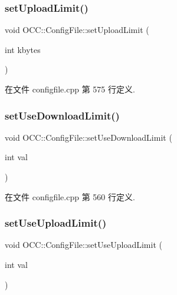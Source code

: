 \subsubsection{\texorpdfstring{set\+Upload\+Limit()}{setUploadLimit()}}
{\footnotesize\ttfamily void O\+C\+C\+::\+Config\+File\+::set\+Upload\+Limit (\begin{DoxyParamCaption}\item[{int}]{kbytes }\end{DoxyParamCaption})}



在文件 configfile.\+cpp 第 575 行定义.

\mbox{\label{class_o_c_c_1_1_config_file_a4e2e992fdd9d9a0888920d9a903fa0a9}} 
\subsubsection{\texorpdfstring{set\+Use\+Download\+Limit()}{setUseDownloadLimit()}}
{\footnotesize\ttfamily void O\+C\+C\+::\+Config\+File\+::set\+Use\+Download\+Limit (\begin{DoxyParamCaption}\item[{int}]{val }\end{DoxyParamCaption})}



在文件 configfile.\+cpp 第 560 行定义.

\mbox{\label{class_o_c_c_1_1_config_file_ae2c9c8aedf58603117741c6fb57f73be}} 
\subsubsection{\texorpdfstring{set\+Use\+Upload\+Limit()}{setUseUploadLimit()}}
{\footnotesize\ttfamily void O\+C\+C\+::\+Config\+File\+::set\+Use\+Upload\+Limit (\begin{DoxyParamCaption}\item[{int}]{val }\end{DoxyParamCaption})}



